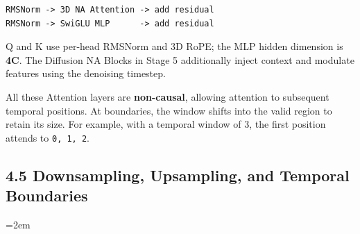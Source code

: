 \documentclass[
  11pt,
  a4paper,
]{article}
\newcommand{\NotesTableStyle}{\linespread{1}\fontsize{9.5pt}{13pt}\selectfont\setlength{\tabcolsep}{4pt}\renewcommand{\arraystretch}{1.1}\setlength{\extrarowheight}{5pt}\setlength{\LTpre}{5pt}\setlength{\LTpost}{6pt}\setlength{\parskip}{0pt}\emergencystretch=2em}
\begin{document}
\begin{verbatim}
RMSNorm -> 3D NA Attention -> add residual
RMSNorm -> SwiGLU MLP      -> add residual
\end{verbatim}

Q and K use per-head RMSNorm and 3D RoPE; the MLP hidden dimension is
\textbf{4C}. The Diffusion NA Blocks in Stage 5 additionally inject
context and modulate features using the denoising timestep.

All these Attention layers are \textbf{non-causal}, allowing attention
to subsequent temporal positions. At boundaries, the window shifts into
the valid region to retain its size. For example, with a temporal window
of 3, the first position attends to \texttt{0,\ 1,\ 2}.

\clearpage

\subsection{4.5 Downsampling, Upsampling, and Temporal
Boundaries}\label{ltx25-sampling}

\begingroup\NotesTableStyle\fontsize{10pt}{12pt}\selectfont\renewcommand{\arraystretch}{1.02}\setlength{\extrarowheight}{1pt}
\end{document}
